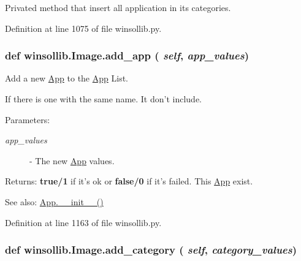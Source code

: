 Privated method that insert all application in its categories. 



Definition at line 1075 of file winsollib.py.\hypertarget{classwinsollib_1_1Image_570270bfa2b73c87be771ea5125dad70}{
\subsubsection[add\_\-app]{\setlength{\rightskip}{0pt plus 5cm}def winsollib.Image.add\_\-app ( {\em self},  {\em app\_\-values})}}
\label{classwinsollib_1_1Image_570270bfa2b73c87be771ea5125dad70}


Add a new \hyperlink{classwinsollib_1_1App}{App} to the \hyperlink{classwinsollib_1_1App}{App} List. 

If there is one with the same name. It don't include.

\begin{Desc}
\item[Parameters:]
\begin{description}
\item[{\em app\_\-values}]- The new \hyperlink{classwinsollib_1_1App}{App} values. \end{description}
\end{Desc}
\begin{Desc}
\item[Returns:]{\bf true/1} if it's ok or {\bf false/0} if it's failed. This \hyperlink{classwinsollib_1_1App}{App} exist.\end{Desc}
\begin{Desc}
\item[See also:]\hyperlink{classwinsollib_1_1App_edd0227fef6f6212583896750e1986ef}{App.\_\-\_\-init\_\-\_\-()} \end{Desc}


Definition at line 1163 of file winsollib.py.\hypertarget{classwinsollib_1_1Image_7c2ae4e3733ff7816663c7c641275a47}{
\subsubsection[add\_\-category]{\setlength{\rightskip}{0pt plus 5cm}def winsollib.Image.add\_\-category ( {\em self},  {\em category\_\-values})}}
\label{classwinsollib_1_1Image_7c2ae4e3733ff7816663c7c641275a47}


